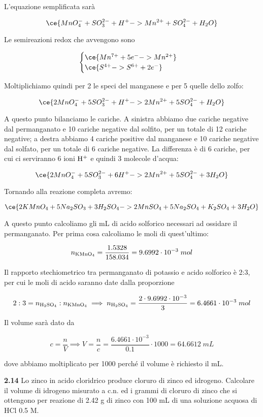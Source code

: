 L'equazione semplificata sarà

$$\ce{MnO_4^- + SO_3^{2-} + H^+ -> Mn^{2+} + SO_4^{2-} + H_2O}$$

Le semireazioni redox che avvengono sono

$$\begin{cases}
\ce{Mn^{7+} + 5e^- -> Mn^{2+}}\\
\ce{S^{4+} -> S^{6+} + 2e^-}
\end{cases}$$

Moltiplichiamo quindi per 2 le speci del manganese e per 5 quelle dello zolfo:

$$\ce{2MnO_4^- + 5SO_3^{2-} + H^+ -> 2Mn^{2+} + 5SO_4^{2-} + H_2O}$$

A questo punto bilanciamo le cariche. A sinistra abbiamo due cariche negative dal permanganato e 10 cariche negative dal solfito, per un totale di 12 cariche negative; a destra abbiamo 4 cariche positive dal manganese e 10 cariche negative dal solfato, per un totale di 6 cariche negative. La differenza è di 6 cariche, per cui ci serviranno 6 ioni $\rm H^+$ e quindi 3 molecole d'acqua:

$$\ce{2MnO_4^- + 5SO_3^{2-} + 6H^+ -> 2Mn^{2+} + 5SO_4^{2-} + 3H_2O}$$

Tornando alla reazione completa avremo:

$$\ce{2KMnO_4 + 5Na_2SO_3 + 3H_2SO_4 -> 2MnSO_4 + 5Na_2SO_4 + K_2SO_4 + 3H_2O}$$

A questo punto calcoliamo gli mL di acido solforico necessari ad ossidare il permanganato. Per prima cosa calcoliamo le moli di quest'ultimo:

$$n_{\rm KMnO_4}=\frac{1.5328}{158.034}
=9.6992 \cdot 10^{-3}\;mol$$

Il rapporto stechiometrico tra permanganato di potassio e acido solforico è 2:3, per cui le moli di acido saranno date dalla proporzione

$$2:3=n_{\rm H_2SO_4}:n_{\rm KMnO_4}
\implies
n_{\rm H_2SO_4}=\frac{2 \cdot 9.6992 \cdot 10^{-3}}{3}
=6.4661 \cdot 10^{-3}\;mol$$

Il volume sarà dato da

$$c=\frac{n}{V}
\implies
V=\frac{n}{c}=\frac{6.4661 \cdot 10^{-3}}{0.1} \cdot 1000
=64.6612\;mL$$

dove abbiamo moltiplicato per 1000 perché il volume è richiesto il mL.

\vspace{0.2cm}\textbf{2.14} Lo zinco in acido cloridrico produce cloruro di zinco ed idrogeno. Calcolare il volume di
idrogeno misurato a c.n. ed i grammi di cloruro di zinco che si ottengono per reazione di 2.42 g di zinco con 100 mL di una soluzione acquosa di HCl 0.5 M.

